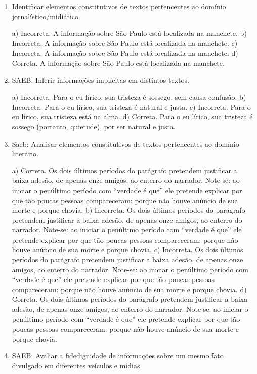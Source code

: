 \begin{enumerate}
	\item
Identificar elementos constitutivos de textos pertencentes ao domínio
jornalístico/midiático.

a) Incorreta. A informação sobre São Paulo está localizada na manchete.
b) Incorreta. A informação sobre São Paulo está localizada na manchete.
c) Incorreta. A informação sobre São Paulo está localizada na manchete.
d) Correta. A informação sobre São Paulo está localizada na manchete.

	\item
SAEB: Inferir informações implícitas em distintos textos.

a) Incorreta. Para o eu lírico, sua tristeza é sossego, sem causa confusão.
b) Incorreta. Para o eu lírico, sua tristeza é natural e justa. 
c) Incorreta. Para o eu lírico, sua tristeza está na alma.
d) Correta. Para o eu lírico, sua tristeza é sossego (portanto, quietude),
por ser natural e justa.

	\item
Saeb: Analisar elementos constitutivos de textos pertencentes ao domínio literário.

a) Correta. Os dois últimos períodos do parágrafo pretendem justificar a baixa
adesão, de apenas onze amigos, ao enterro do narrador. Note-se: ao iniciar o 
penúltimo período com ``verdade é que'' ele pretende explicar por que tão 
poucas pessoas compareceram: porque não houve anúncio de sua morte e porque chovia.
b) Incorreta. Os dois últimos períodos do parágrafo pretendem justificar a baixa
adesão, de apenas onze amigos, ao enterro do narrador. Note-se: ao iniciar o 
penúltimo período com ``verdade é que'' ele pretende explicar por que tão 
poucas pessoas compareceram: porque não houve anúncio de sua morte e porque chovia.
c) Incorreta. Os dois últimos períodos do parágrafo pretendem justificar a baixa
adesão, de apenas onze amigos, ao enterro do narrador. Note-se: ao iniciar o 
penúltimo período com ``verdade é que'' ele pretende explicar por que tão 
poucas pessoas compareceram: porque não houve anúncio de sua morte e porque chovia.
d) Correta. Os dois últimos períodos do parágrafo pretendem justificar a baixa
adesão, de apenas onze amigos, ao enterro do narrador. Note-se: ao iniciar o 
penúltimo período com ``verdade é que'' ele pretende explicar por que tão 
poucas pessoas compareceram: porque não houve anúncio de sua morte e porque chovia.
	
	\item
SAEB: Avaliar a fidedignidade de informações sobre um mesmo fato
divulgado em diferentes veículos e mídias.


\end{enumerate}
